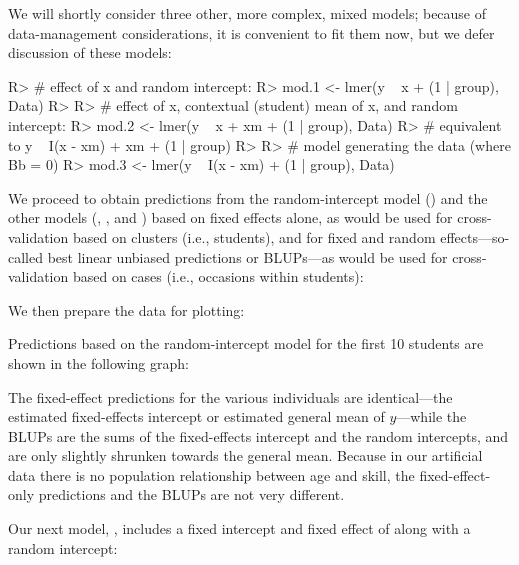 \documentclass[
]{jss}
\begin{document}
We will shortly consider three other, more complex, mixed models;
because of data-management considerations, it is convenient to fit them
now, but we defer discussion of these models:

\begin{CodeChunk}
\begin{CodeInput}
R> # effect of x and random intercept:
R> mod.1 <- lmer(y ~ x + (1 | group), Data)
R> 
R> # effect of x, contextual (student) mean of x, and random intercept:
R> mod.2 <- lmer(y ~ x + xm + (1 | group), Data)
R>         # equivalent to y ~ I(x - xm) + xm + (1 | group)
R> 
R> # model generating the data (where Bb = 0)
R> mod.3 <- lmer(y ~ I(x - xm) + (1 | group), Data)
\end{CodeInput}
\end{CodeChunk}

We proceed to obtain predictions from the random-intercept model
() and the other models (, , and
) based on fixed effects alone, as would be used for
cross-validation based on clusters (i.e., students), and for fixed and
random effects---so-called best linear unbiased predictions or
BLUPs---as would be used for cross-validation based on cases (i.e.,
occasions within students):

We then prepare the data for plotting:

Predictions based on the random-intercept model  for the
first 10 students are shown in the following graph:

The fixed-effect predictions for the various individuals are
identical---the estimated fixed-effects intercept or estimated general
mean of \(y\)---while the BLUPs are the sums of the fixed-effects
intercept and the random intercepts, and are only slightly shrunken
towards the general mean. Because in our artificial data there is no
population relationship between age and skill, the fixed-effect-only
predictions and the BLUPs are not very different.

Our next model, , includes a fixed intercept and fixed
effect of  along with a random intercept:
\end{document}
